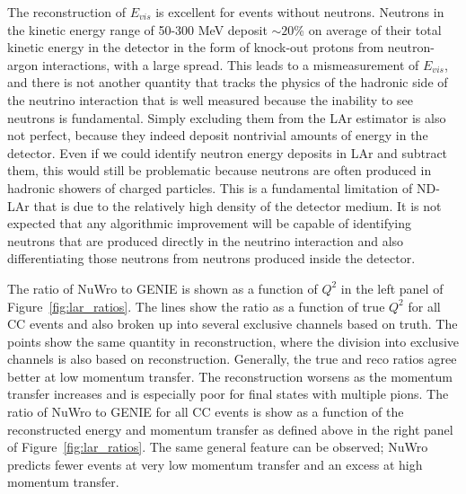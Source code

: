 \documentclass[11pt]{article}
\begin{document}
The reconstruction of $E_{vis}$ is excellent for events without neutrons. Neutrons in the kinetic energy range of 50-300 MeV deposit $\sim 20$\% on average of their total kinetic energy in the detector in the form of knock-out protons from neutron-argon interactions, with a large spread. This leads to a mismeasurement of $E_{vis}$, and there is not another quantity that tracks the physics of the hadronic side of the neutrino interaction that is well measured because the inability to see neutrons is fundamental. Simply excluding them from the LAr estimator is also not perfect, because they indeed deposit nontrivial amounts of energy in the detector. Even if we could identify neutron energy deposits in LAr and subtract them, this would still be problematic because neutrons are often produced in hadronic showers of charged particles. This is a fundamental limitation of ND-LAr that is due to the relatively high density of the detector medium. It is not expected that any algorithmic improvement will be capable of identifying neutrons that are produced directly in the neutrino interaction and also differentiating those neutrons from neutrons produced inside the detector.

The ratio of NuWro to GENIE is shown as a function of $Q^{2}$ in the left panel of Figure~\ref{fig:lar_ratios}. The lines show the ratio as a function of true $Q^{2}$ for all CC events and also broken up into several exclusive channels based on truth. The points show the same quantity in reconstruction, where the division into exclusive channels is also based on reconstruction. Generally, the true and reco ratios agree better at low momentum transfer. The reconstruction worsens as the momentum transfer increases and is especially poor for final states with multiple pions. The ratio of NuWro to GENIE for all CC events is show as a function of the reconstructed energy and momentum transfer as defined above in the right panel of Figure~\ref{fig:lar_ratios}. The same general feature can be observed; NuWro predicts fewer events at very low momentum transfer and an excess at high momentum transfer.
\end{document}
